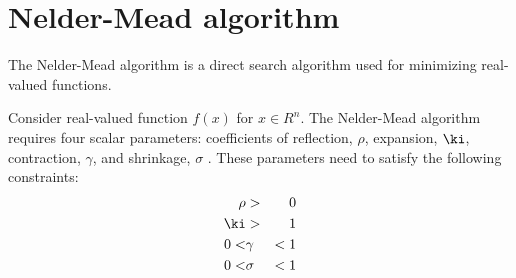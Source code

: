 \chapter{Nelder-Mead algorithm}
\label{chp:Nelder}

The Nelder-Mead algorithm is a direct search algorithm used for minimizing real-valued functions. 

Consider real-valued function $f(x)$ for $x \in R^{n}$. The Nelder-Mead algorithm requires four scalar parameters: coefficients of reflection, $\rho$, expansion, $\ki$, contraction, $\gamma$, and shrinkage, $\sigma$ \cite{Lagarias1998}.
These parameters need to satisfy the following constraints:
\begin{eqnarray}
\rho &>& 0\\
\ki &>& 1\\
0 < &\gamma& < 1\\
0 < &\sigma& < 1
\label{eq:NelCo}
\end{eqnarray}
\endinput